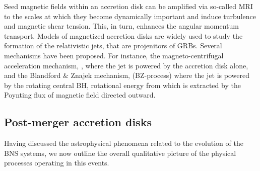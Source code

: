 Seed magnetic fields within an accretion disk can be amplified via so-called \ac{MRI} to the 
scales at which they become dynamically important and induce turbulence and magnetic 
shear tension. This, in turn, enhances the angular momentum transport. 
Models of magnetized accretion disks are widely used to study the formation of the 
relativistic jets, that are projenitors of \acp{GRB}. 
Several mechanisms have been proposed. For instance, the 
magneto-centrifugal acceleration mechanism, \cite{e.g. Spruit, 2010b}, where 
the jet is powered by the accretion disk alone, and the Blandford \& Znajek mechanism, 
(BZ-process) where the jet is powered by the rotating central BH, rotational energy from
which is extracted by the Poynting flux of magnetic field directed outward.


\subsection{Post-merger accretion disks}

Having discussed the astrophysical phenomena related to the \pmerg{} evolution of 
the \ac{BNS} systems, we now outline the overall qualitative picture of the physical 
processes operating in this events.


